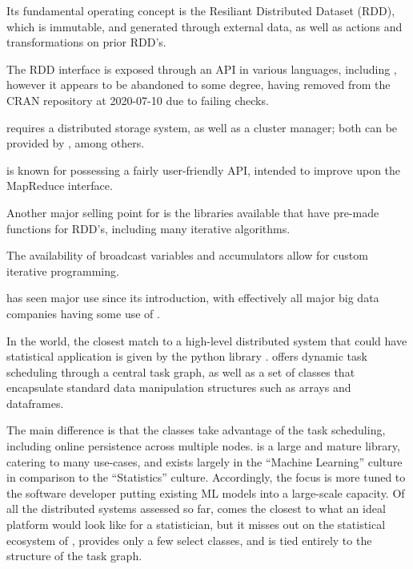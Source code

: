 Its fundamental operating concept is the Resiliant Distributed Dataset
(RDD), which is immutable, and generated through external data, as well
as actions and transformations on prior RDD's.

The RDD interface is exposed through an API in various languages,
including \R, however it appears to be abandoned to some degree, having
removed from the CRAN repository at 2020-07-10 due to failing checks.

 requires a distributed storage system, as well as a cluster
manager; both can be provided by , among others.

 is known for possessing a fairly user-friendly API, intended to
improve upon the MapReduce interface.

Another major selling point for  is the libraries available that
have pre-made functions for RDD's, including many iterative algorithms.

The availability of broadcast variables and accumulators allow for
custom iterative programming.

 has seen major use since its introduction, with effectively all
major big data companies having some use of .

In the  world, the closest match to a high-level distributed
system that could have statistical application is given by the python
library \cite{rocklin2015dask}.  offers
dynamic task scheduling through a central task graph, as well as a set
of classes that encapsulate standard data manipulation structures such
as  arrays and  dataframes.

The main difference is that the  classes take advantage of
the task scheduling, including online persistence across multiple nodes.
 is a large and mature library, catering to many use-cases,
and exists largely in the  ``Machine Learning'' culture in
comparison to the \R ``Statistics'' culture. Accordingly, the focus is
more tuned to the  software developer putting existing ML models
into a large-scale capacity. Of all the distributed systems assessed so
far,  comes the closest to what an ideal platform would
look like for a statistician, but it misses out on the statistical
ecosystem of \R, provides only a few select classes, and is tied entirely
to the structure of the task graph.

